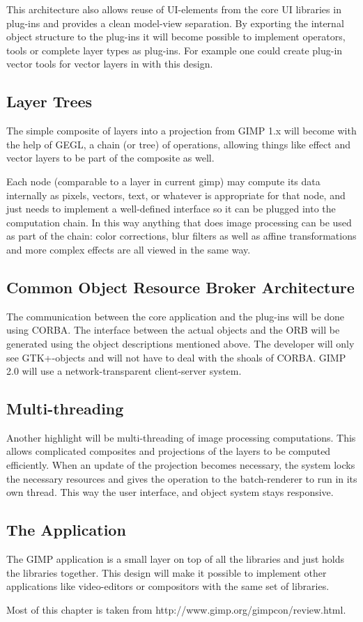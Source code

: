 This architecture also allows reuse of UI-elements from the core UI libraries
in plug-ins and provides a clean model-view separation. By exporting the
internal object structure to the plug-ins it will become possible to implement
operators, tools or complete layer types as plug-ins. For example one could
create plug-in vector tools for vector layers in with this design.

\subsection{Layer Trees}
 
The simple composite of layers into a projection from GIMP 1.x will become with
the help of GEGL, a chain (or tree) of operations, allowing things like effect
and vector layers to be part of the composite as well. 

Each node (comparable to a layer in current gimp) may compute its data
internally as pixels, vectors, text, or whatever is appropriate for that node,
and  just needs to implement a well-defined interface so it can be plugged into
the computation chain. In this way anything that does image processing
can be used as part of the chain: color corrections, blur filters as well as
affine transformations and more complex effects are all viewed in 
the same way.

\subsection{Common Object Resource Broker Architecture}

The communication between the core application and the plug-ins will be done
using CORBA. The interface between the actual objects and the ORB will be
generated using the object descriptions mentioned above. The developer will
only see GTK+-objects and will not have to deal with the shoals of CORBA.  GIMP
2.0 will use a network-transparent client-server system.

\subsection{Multi-threading}

Another highlight will be multi-threading of image processing computations.
This allows complicated composites and projections of the layers to be computed
efficiently. When an update of the projection becomes necessary, the system
locks the necessary resources and gives the operation to the batch-renderer to
run in its own thread. This way the user interface, and object system stays
responsive.

\subsection{The Application}
The GIMP application is a small layer on top of all the libraries and just
holds the libraries together.  This design will make it possible to implement
other applications like video-editors or compositors with the same set of
libraries.

Most of this chapter is taken from http://www.gimp.org/gimpcon/review.html.
 
